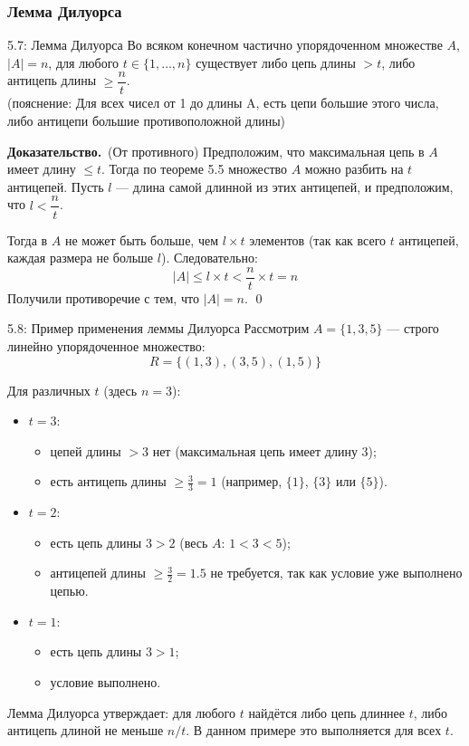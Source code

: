 \documentclass[a4paper,12pt]{article}
\newcommand{\myproof}{\textbf{Доказательство.}\ }
\begin{document}
	\subsubsection{Лемма Дилуорса}
	
	\begin{theorembox}{5.7: Лемма Дилуорса}
		Во всяком конечном частично упорядоченном множестве $A$, $|A| = n$, для любого $t \in \{1, \ldots, n\}$ существует либо цепь длины $> t$, либо антицепь длины $\geq \dfrac{n}{t}$.\\
		
		(пояснение: Для всех чисел от 1 до длины A, есть цепи большие этого числа, либо антицепи большие противоположной длины)
	\end{theorembox}
	
	\myproof (От противного)
	Предположим, что максимальная цепь в $A$ имеет длину $\le t$. Тогда по теореме 5.5 множество $A$ можно разбить на $t$ антицепей. Пусть $l$ — длина самой длинной из этих антицепей, и предположим, что $l < \dfrac{n}{t}$.
	
	Тогда в $A$ не может быть больше, чем $l \times t$ элементов (так как всего $t$ антицепей, каждая размера не больше $l$). Следовательно:
	\[ |A| \le l \times t < \frac{n}{t} \times t = n \]
	Получили противоречие с тем, что $|A| = n$. \qed
	
	\begin{examplebox}{5.8: Пример применения леммы Дилуорса}
		Рассмотрим $A = \{1, 3, 5\}$ — строго линейно упорядоченное множество:
		\[ R = \{(1, 3), (3, 5), (1, 5)\} \]
		
		Для различных $t$ (здесь $n=3$):
		\begin{itemize}
			\item $t = 3$: 
			\begin{itemize}
				\item цепей длины $>3$ нет (максимальная цепь имеет длину 3);
				\item есть антицепь длины $\ge \frac{3}{3}=1$ (например, $\{1\}$, $\{3\}$ или $\{5\}$).
			\end{itemize}
			\item $t = 2$: 
			\begin{itemize}
				\item есть цепь длины $3 > 2$ (весь $A$: $1<3<5$);
				\item антицепей длины $\ge \frac{3}{2}=1.5$ не требуется, так как условие уже выполнено цепью.
			\end{itemize}
			\item $t = 1$: 
			\begin{itemize}
				\item есть цепь длины $3 > 1$;
				\item условие выполнено.
			\end{itemize}
		\end{itemize}
		
		Лемма Дилуорса утверждает: для любого $t$ найдётся либо цепь длиннее $t$, либо антицепь длиной не меньше $n/t$. В данном примере это выполняется для всех $t$.
	\end{examplebox}
	
\end{document}
